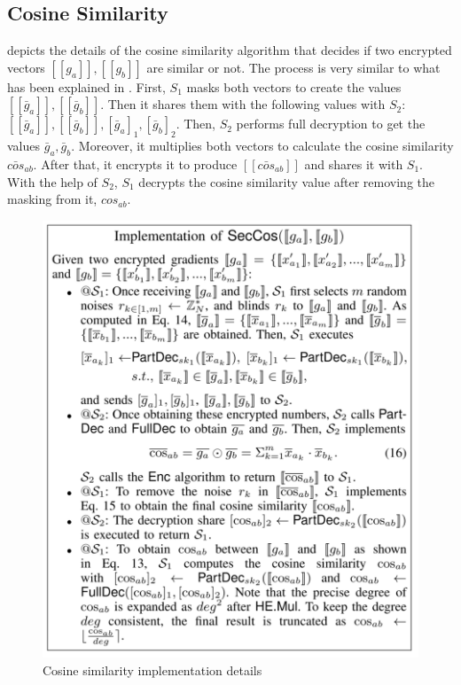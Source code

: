 \begin{appendices}
\section{Cosine Similarity}
\label{app:cos-similarity}

 depicts the details of the cosine similarity algorithm that decides if two encrypted vectors $[[g_a]], [[g_b]]$ are similar or not.
The process is very similar to what has been explained in .
First, $S_1$ masks both vectors to create the values $[[\bar{g}_a]], [[\bar{g}_b]]$.
Then it shares them with the following values with $S_2$: $[[\bar{g}_a]], [[\bar{g}_b]], [\bar{g}_a]_1, [\bar{g}_b]_2$.
Then, $S_2$ performs full decryption to get the values $\bar{g}_a, \bar{g}_b$.
Moreover, it multiplies both vectors to calculate the cosine similarity $\bar{cos}_{ab}$.
After that, it encrypts it to produce $[[\bar{cos}_{ab}]]$ and shares it with $S_1$.
With the help of $S_2$, $S_1$ decrypts the cosine similarity value after removing the masking from it, $cos_{ab}$.

\begin{figure}[thb]
\centering
  \includegraphics[width=0.8\linewidth]{resources/sec-cos-impl.pdf}
  \caption{Cosine similarity implementation details}
  \label{fig:sec-cos-impl}
\end{figure}

\end{appendices}

